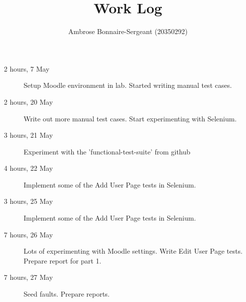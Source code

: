 \documentclass{article}
\title{Work Log}
\author{Ambrose Bonnaire-Sergeant (20350292)}
\begin{document}
\maketitle

\begin{description}
  \item[2 hours, 7 May] Setup Moodle environment in lab. Started writing manual test cases.
  \item[2 hours, 20 May] Write out more manual test cases. Start experimenting with Selenium.
  \item[3 hours, 21 May] Experiment with the 'functional-test-suite' from github
  \item[4 hours, 22 May] Implement some of the Add User Page tests in Selenium.
  \item[3 hours, 25 May] Implement some of the Add User Page tests in Selenium.
  \item[7 hours, 26 May] Lots of experimenting with Moodle settings. Write Edit User Page tests. Prepare report for part 1.
  \item[7 hours, 27 May] Seed faults. Prepare reports.
\end{description}
\end{document}
